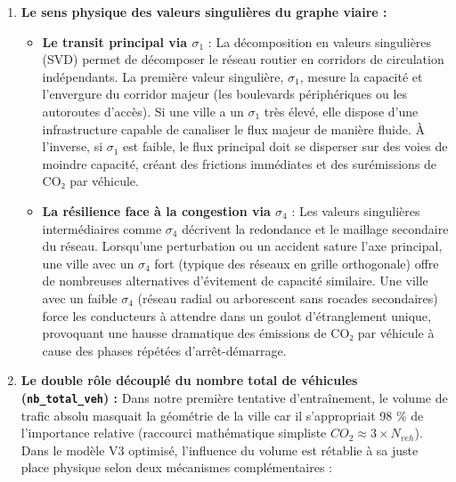 \documentclass[10pt, a4paper]{article}
\providecommand{\tightlist}{}
\begin{document}
\begin{enumerate}
\def\labelenumi{\arabic{enumi}.}
\item
  \textbf{Le sens physique des valeurs singulières du graphe viaire :}

  \begin{itemize}
  \tightlist
  \item
    \textbf{Le transit principal via \(\sigma_1\)} : La décomposition en
    valeurs singulières (SVD) permet de décomposer le réseau routier en
    corridors de circulation indépendants. La première valeur
    singulière, \(\sigma_1\), mesure la capacité et l'envergure du
    corridor majeur (les boulevards périphériques ou les autoroutes
    d'accès). Si une ville a un \(\sigma_1\) très élevé, elle dispose
    d'une infrastructure capable de canaliser le flux majeur de manière
    fluide. À l'inverse, si \(\sigma_1\) est faible, le flux principal
    doit se disperser sur des voies de moindre capacité, créant des
    frictions immédiates et des surémissions de CO₂ par véhicule.
  \item
    \textbf{La résilience face à la congestion via \(\sigma_4\)} : Les
    valeurs singulières intermédiaires comme \(\sigma_4\) décrivent la
    redondance et le maillage secondaire du réseau. Lorsqu'une
    perturbation ou un accident sature l'axe principal, une ville avec
    un \(\sigma_4\) fort (typique des réseaux en grille orthogonale)
    offre de nombreuses alternatives d'évitement de capacité similaire.
    Une ville avec un faible \(\sigma_4\) (réseau radial ou arborescent
    sans rocades secondaires) force les conducteurs à attendre dans un
    goulot d'étranglement unique, provoquant une hausse dramatique des
    émissions de CO₂ par véhicule à cause des phases répétées
    d'arrêt-démarrage.
  \end{itemize}
\item
  \textbf{Le double rôle découplé du nombre total de véhicules
  (\texttt{nb\_total\_veh}) :} Dans notre première tentative
  d'entraînement, le volume de trafic absolu masquait la géométrie de la
  ville car il s'appropriait 98 \% de l'importance relative (raccourci
  mathématique simpliste \(CO_2 \approx 3 \times N_{veh}\)). Dans le
  modèle V3 optimisé, l'influence du volume est rétablie à sa juste
  place physique selon deux mécanismes complémentaires :


\end{enumerate}
\end{document}
